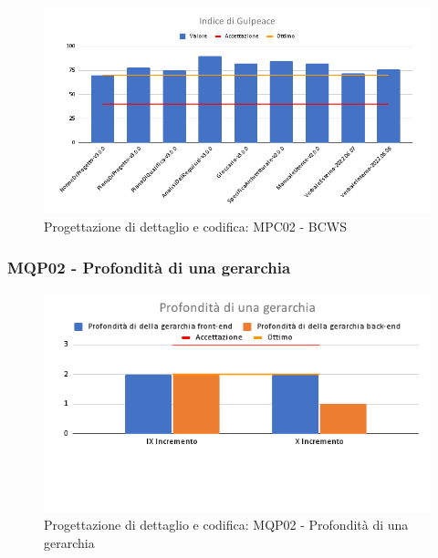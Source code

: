 \begin{figure}[H]
    \centering
    \includegraphics[scale=0.50]{Sezioni/images/last_prodotto/Indice_di_Gulpeace.png}
    \caption{Progettazione di dettaglio e codifica: MPC02 - BCWS}
\end{figure}
\subsubsection{MQP02 - Profondità di una gerarchia}
\begin{figure}[H]
    \centering
    \includegraphics[scale=0.50]{Sezioni/images/last_prodotto/Profondita_di_una_gerarchia.png}
    \caption{Progettazione di dettaglio e codifica: MQP02 - Profondità di una gerarchia}
\end{figure}
